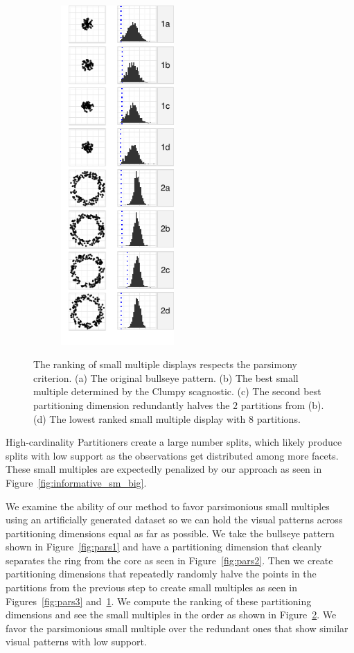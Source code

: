 \begin{figure}
\begin{subfigure}[b]{1.7in}
	\includegraphics[width=1.7in]{images/5_12851615653375-cluster2.pdf}
      \caption{}
      \label{fig:pars4}
    \end{subfigure}
    \caption{The ranking of small multiple displays respects the parsimony criterion. (a) The original bullseye pattern. (b) The best small multiple determined by the Clumpy scagnostic. (c) The second best partitioning dimension redundantly halves the $2$ partitions from (b). (d) The lowest ranked small multiple display with $8$ partitions.}
    \label{fig:parsimonious}
  \end{figure}

High-cardinality Partitioners create a large number splits, which likely produce splits with low support as the observations get distributed among more facets. These small multiples are expectedly penalized by our approach as seen in Figure~\ref{fig:informative_sm_big}.

We examine the ability of our method to favor parsimonious small multiples using an artificially generated dataset so we can hold the visual patterns across partitioning dimensions equal as far as possible. We take the bullseye pattern shown in Figure~\ref{fig:pars1} and have a partitioning dimension that cleanly separates the ring from the core as seen in Figure~\ref{fig:pars2}. Then we create partitioning dimensions that repeatedly randomly halve the points in the partitions from the previous step to create small multiples as seen in Figures~\ref{fig:pars3} and~\ref{fig:pars4}. We compute the ranking of these partitioning dimensions and see the small multiples in the order as shown in Figure~\ref{fig:parsimonious}. We favor the parsimonious small multiple over the redundant ones that show similar visual patterns with low support. 

